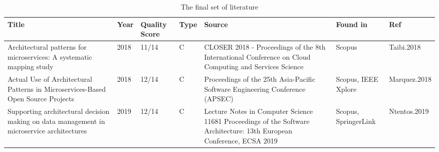 \begin{table*}[h]
    \renewcommand{\arraystretch}{1.5}
    \caption[]{The final set of literature}
    \begin{tabular}{|p{2cm}|p{3cm}|p{9.5cm}|p{2cm}|}
        \hline
        Title & Year & Quality Score & Type & Source & Found in & Ref \\ 

        \hline

        Architectural patterns for microservices: A systematic mapping study & 2018 & 11/14 & C & CLOSER 2018 - Proceedings of the 8th International Conference on Cloud Computing and Services Science & Scopus & Taibi.2018 \\ 
        \hline
        Actual Use of Architectural Patterns in Microservices-Based Open Source Projects & 2018 & 12/14 & C & Proceedings of the 25th Asia-Pacific Software Engineering Conference (APSEC) & Scopus, IEEE Xplore & Marquez.2018 \\ 
        \hline  
        Supporting architectural decision making on data management in microservice architectures & 2019 & 12/14 & C & Lecture Notes in Computer Science 11681
Proceedings of the Software Architecture: 13th European Conference, ECSA 2019 & Scopus, SpringerLink & Ntentos.2019 \\ 
       

\end{tabular}
\end{table*}
